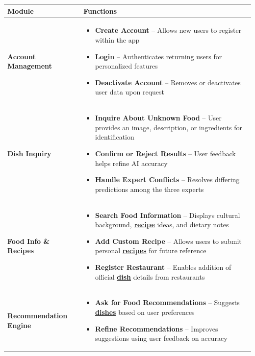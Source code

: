 \documentclass[]{article}
\begin{document}
\begin{table}[H]
\centering
\renewcommand{\arraystretch}{1.2} %
\begin{tabular}{|p{4cm}|p{10cm}|}
\hline
\textbf{Module} & \textbf{Functions} \\
\hline
\textbf{Account Management} &
\begin{itemize}
    \item \textbf{Create Account} – Allows new users to register within the app
    \item \textbf{Login} – Authenticates returning users for personalized features
    \item \textbf{Deactivate Account} – Removes or deactivates user data upon request
\end{itemize} \\
\hline
\textbf{Dish Inquiry} &
\begin{itemize}
    \item \textbf{Inquire About Unknown Food} – User provides an image, description, or ingredients for identification
    \item \textbf{Confirm or Reject Results} – User feedback helps refine AI accuracy
    \item \textbf{Handle Expert Conflicts} – Resolves differing predictions among the three experts
\end{itemize} \\
\hline
\textbf{Food Info \& Recipes} &
\begin{itemize}
    \item \textbf{Search Food Information} – Displays cultural background, \hyperref[Recipe]{\textbf{recipe}} ideas, and dietary notes
    \item \textbf{Add Custom Recipe} – Allows users to submit personal \hyperref[Recipe]{\textbf{recipes}} for future reference
    \item \textbf{Register Restaurant} – Enables addition of official \hyperref[Dish]{\textbf{dish}} details from restaurants
\end{itemize} \\
\hline
\textbf{Recommendation Engine} &
\begin{itemize}
    \item \textbf{Ask for Food Recommendations} – Suggests \hyperref[Dish]{\textbf{dishes}} based on user preferences
    \item \textbf{Refine Recommendations} – Improves suggestions using user feedback on accuracy
\end{itemize} \\

\end{tabular}
\end{table}
\end{document}
